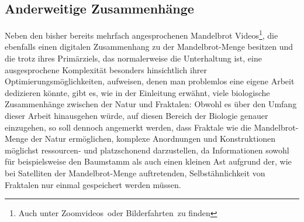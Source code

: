 \subsection{Anderweitige Zusammenhänge}\label{subsec:other-connections}

Neben den bisher bereits mehrfach angesprochenen
\glqq Mandelbrot Videos\grqq\footnote{
  Auch unter \glqq Zoomvideos\grqq~oder \glqq Bilderfahrten\grqq~zu finden
}, die ebenfalls einen digitalen Zusammenhang zu der Mandelbrot-Menge besitzen
und die trotz ihres Primärziels, das normalerweise die Unterhaltung ist, eine
ausgesprochene Komplexität besonders hinsichtlich ihrer Optimierungsmöglichkeiten,
aufweisen, denen man problemlos eine eigene Arbeit dedizieren könnte,
gibt es, wie in der Einleitung erwähnt,
viele biologische Zusammenhänge zwischen der Natur und Fraktalen:
Obwohl es über den Umfang dieser Arbeit hinausgehen würde, auf diesen Bereich
der Biologie genauer einzugehen, so soll dennoch angemerkt werden,
dass Fraktale wie die Mandelbrot-Menge der Natur ermöglichen,
komplexe Anordnungen und Konstruktionen möglichst ressourcen- und platzschonend
darzustellen, da Informationen sowohl für beispielsweise den Baumstamm als auch
einen kleinen Ast aufgrund der, wie bei Satelliten der Mandelbrot-Menge auftretenden,
Selbstähnlichkeit von Fraktalen nur einmal gespeichert werden müssen.